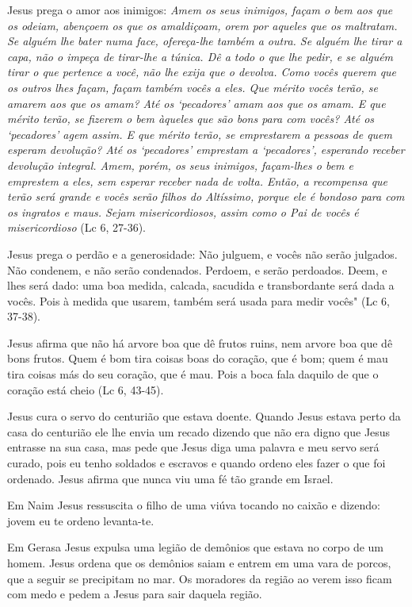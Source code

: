 \documentclass[
]{book}
\begin{document}
Jesus prega o amor aos inimigos: \emph{Amem os seus inimigos, façam o bem aos que os odeiam, abençoem os que os amaldiçoam, orem por aqueles que os maltratam. Se alguém lhe bater numa face, ofereça-lhe também a outra. Se alguém lhe tirar a capa, não o impeça de tirar-lhe a túnica. Dê a todo o que lhe pedir, e se alguém tirar o que pertence a você, não lhe exija que o devolva. Como vocês querem que os outros lhes façam, façam também vocês a eles. Que mérito vocês terão, se amarem aos que os amam? Até os `pecadores' amam aos que os amam. E que mérito terão, se fizerem o bem àqueles que são bons para com vocês? Até os `pecadores' agem assim. E que mérito terão, se emprestarem a pessoas de quem esperam devolução? Até os `pecadores' emprestam a `pecadores', esperando receber devolução integral. Amem, porém, os seus inimigos, façam-lhes o bem e emprestem a eles, sem esperar receber nada de volta. Então, a recompensa que terão será grande e vocês serão filhos do Altíssimo, porque ele é bondoso para com os ingratos e maus. Sejam misericordiosos, assim como o Pai de vocês é misericordioso} (Lc 6, 27-36).

Jesus prega o perdão e a generosidade: Não julguem, e vocês não serão julgados. Não condenem, e não serão condenados. Perdoem, e serão perdoados. Deem, e lhes será dado: uma boa medida, calcada, sacudida e transbordante será dada a vocês. Pois à medida que usarem, também será usada para medir vocês" (Lc 6, 37-38).

Jesus afirma que não há arvore boa que dê frutos ruins, nem arvore boa que dê bons frutos. Quem é bom tira coisas boas do coração, que é bom; quem é mau tira coisas más do seu coração, que é mau. Pois a boca fala daquilo de que o coração está cheio (Lc 6, 43-45).

Jesus cura o servo do centurião que estava doente. Quando Jesus estava perto da casa do centurião ele lhe envia um recado dizendo que não era digno que Jesus entrasse na sua casa, mas pede que Jesus diga uma palavra e meu servo será curado, pois eu tenho soldados e escravos e quando ordeno eles fazer o que foi ordenado. Jesus afirma que nunca viu uma fé tão grande em Israel.

Em Naim Jesus ressuscita o filho de uma viúva tocando no caixão e dizendo: jovem eu te ordeno levanta-te.

Em Gerasa Jesus expulsa uma legião de demônios que estava no corpo de um homem. Jesus ordena que os demônios saiam e entrem em uma vara de porcos, que a seguir se precipitam no mar. Os moradores da região ao verem isso ficam com medo e pedem a Jesus para sair daquela região.
\end{document}
